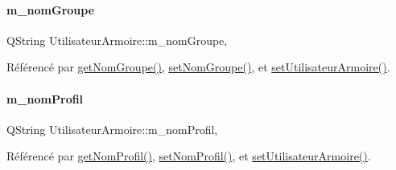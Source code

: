 \mbox{\label{class_utilisateur_armoire_a6cf08d0dafdc9111d34f34a47c78b373}} 
\paragraph{\texorpdfstring{m\+\_\+nom\+Groupe}{m\_nomGroupe}}
{\footnotesize\ttfamily Q\+String Utilisateur\+Armoire\+::m\+\_\+nom\+Groupe\hspace{0.3cm}{\ttfamily [read]}, {\ttfamily [write]}}



Référencé par \hyperlink{class_utilisateur_armoire_a714ef42e6907cf73312a55b7f896682a}{get\+Nom\+Groupe()}, \hyperlink{class_utilisateur_armoire_a4d2361e99dd2e84533ce8a2795607306}{set\+Nom\+Groupe()}, et \hyperlink{class_utilisateur_armoire_a523423ac9e15b8260ca7f5ffc84c008d}{set\+Utilisateur\+Armoire()}.

\mbox{\label{class_utilisateur_armoire_a470f47c105d9b3124c8d284b164a443d}} 
\paragraph{\texorpdfstring{m\+\_\+nom\+Profil}{m\_nomProfil}}
{\footnotesize\ttfamily Q\+String Utilisateur\+Armoire\+::m\+\_\+nom\+Profil\hspace{0.3cm}{\ttfamily [read]}, {\ttfamily [write]}}



Référencé par \hyperlink{class_utilisateur_armoire_a7ab03056bcfa00c2278488f5a381ac18}{get\+Nom\+Profil()}, \hyperlink{class_utilisateur_armoire_ad71dd9b23c6bc145a64727642b1ac3f5}{set\+Nom\+Profil()}, et \hyperlink{class_utilisateur_armoire_a523423ac9e15b8260ca7f5ffc84c008d}{set\+Utilisateur\+Armoire()}.

\mbox{\label{class_utilisateur_armoire_a652d7a57ec09963d16ab82838a5ffc51}} 
